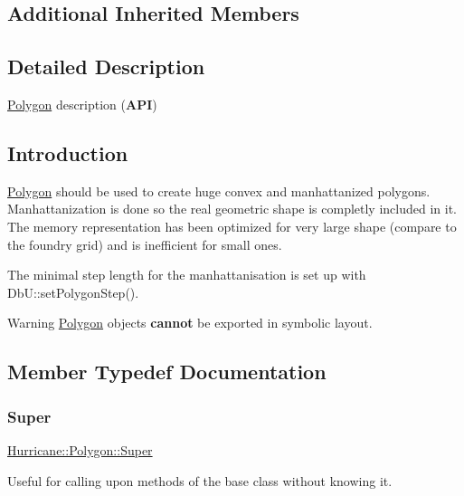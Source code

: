\subsection*{Additional Inherited Members}


\subsection{Detailed Description}
\mbox{\hyperlink{classHurricane_1_1Polygon}{Polygon}} description ({\bfseries A\+PI}) 

\hypertarget{classHurricane_1_1Polygon_secPolygonIntro}{}\subsection{Introduction}\label{classHurricane_1_1Polygon_secPolygonIntro}
\mbox{\hyperlink{classHurricane_1_1Polygon}{Polygon}} should be used to create huge convex and manhattanized polygons. Manhattanization is done so the real geometric shape is completly included in it. The memory representation has been optimized for very large shape (compare to the foundry grid) and is inefficient for small ones.

The minimal step length for the manhattanisation is set up with Db\+U\+::set\+Polygon\+Step().

\begin{DoxyWarning}{Warning}
\mbox{\hyperlink{classHurricane_1_1Polygon}{Polygon}} objects {\bfseries cannot} be exported in symbolic layout. 
\end{DoxyWarning}


\subsection{Member Typedef Documentation}
\mbox{\label{classHurricane_1_1Polygon_adac4dcd1480b81e7778775540b95f81c}} 
\subsubsection{\texorpdfstring{Super}{Super}}
{\footnotesize\ttfamily \mbox{\hyperlink{classHurricane_1_1Polygon_adac4dcd1480b81e7778775540b95f81c}{Hurricane\+::\+Polygon\+::\+Super}}}

Useful for calling upon methods of the base class without knowing it. 

